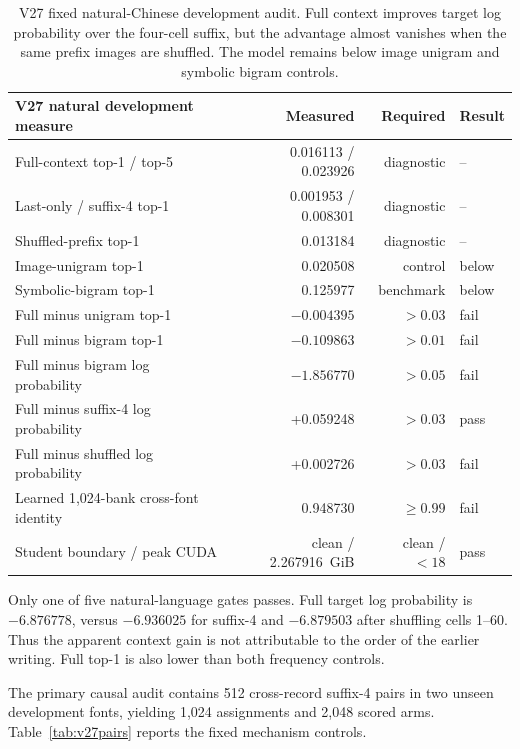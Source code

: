 \documentclass[11pt]{article}
\begin{document}
\begin{table}[h!]
\centering
\small
\begin{tabular}{lrrl}
\toprule
V27 natural development measure & Measured & Required & Result \\
\midrule
Full-context top-1 / top-5 & 0.016113 / 0.023926 & diagnostic & -- \\
Last-only / suffix-4 top-1 & 0.001953 / 0.008301 & diagnostic & -- \\
Shuffled-prefix top-1 & 0.013184 & diagnostic & -- \\
Image-unigram top-1 & 0.020508 & control & below \\
Symbolic-bigram top-1 & 0.125977 & benchmark & below \\
Full minus unigram top-1 & $-0.004395$ & $>0.03$ & fail \\
Full minus bigram top-1 & $-0.109863$ & $>0.01$ & fail \\
Full minus bigram log probability & $-1.856770$ & $>0.05$ & fail \\
Full minus suffix-4 log probability & +0.059248 & $>0.03$ & pass \\
Full minus shuffled log probability & +0.002726 & $>0.03$ & fail \\
Learned 1,024-bank cross-font identity & 0.948730 & $\geq0.99$ & fail \\
Student boundary / peak CUDA & clean / 2.267916~GiB & clean / $<18$ & pass \\
\bottomrule
\end{tabular}
\caption{V27 fixed natural-Chinese development audit. Full context improves
target log probability over the four-cell suffix, but the advantage almost
vanishes when the same prefix images are shuffled. The model remains below
image unigram and symbolic bigram controls.}
\label{tab:v27natural}
\end{table}

Only one of five natural-language gates passes. Full target log probability is
$-6.876778$, versus $-6.936025$ for suffix-4 and $-6.879503$ after shuffling
cells 1--60. Thus the apparent context gain is not attributable to the order of
the earlier writing. Full top-1 is also lower than both frequency controls.

The primary causal audit contains 512 cross-record suffix-4 pairs in two unseen
development fonts, yielding 1,024 assignments and 2,048 scored arms.
Table~\ref{tab:v27pairs} reports the fixed mechanism controls.
\end{document}
